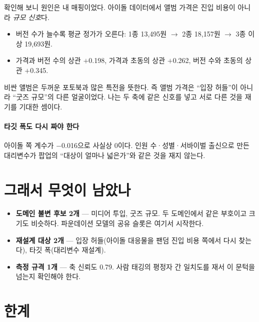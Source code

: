 \documentclass[10pt]{article}
\begin{document}
확인해 보니 원인은 내 매핑이었다. 아이돌 데이터에서 앨범 가격은 진입 비용이 아니라
\emph{규모 신호}다.

\begin{itemize}[leftmargin=1.1em,itemsep=0.15em]
\item 버전 수가 늘수록 평균 정가가 오른다: 1종 13,495원 $\to$ 2종 18,157원
      $\to$ 3종 이상 19,693원.
\item 가격과 버전 수의 상관 $+$0.198, 가격과 초동의 상관 $+$0.262,
      버전 수와 초동의 상관 $+$0.345.
\end{itemize}

비싼 앨범은 두꺼운 포토북과 많은 특전을 뜻한다. 즉 앨범 가격은 ``입장 허들''이
아니라 ``굿즈 규모''의 다른 얼굴이었다. 나는 두 축에 같은 신호를 넣고 서로 다른
것을 재기를 기대한 셈이다.


\paragraph{타깃 폭도 다시 짜야 한다}
아이돌 쪽 계수가 $-$0.016으로 사실상 0이다. 인원 수·성별·서바이벌 출신으로 만든
대리변수가 팝업의 ``대상이 얼마나 넓은가''와 같은 것을 재지 않는다.

\section{그래서 무엇이 남았나}

\begin{itemize}[leftmargin=1.1em,itemsep=0.15em]
\item \textbf{도메인 불변 후보 2개} --- 미디어 투입, 굿즈 규모. 두 도메인에서
      같은 부호이고 크기도 비슷하다. 파운데이션 모델의 공유 슬롯은 여기서 시작한다.
\item \textbf{재설계 대상 2개} --- 입장 허들(아이돌 대응물을 팬덤 진입 비용 쪽에서
      다시 찾는다), 타깃 폭(대리변수 재설계).
\item \textbf{측정 규격 1개} --- 축 신뢰도 0.79. 사람 태깅의 평정자 간 일치도를
      재서 이 문턱을 넘는지 확인해야 한다.
\end{itemize}

\section{한계}
\end{document}
